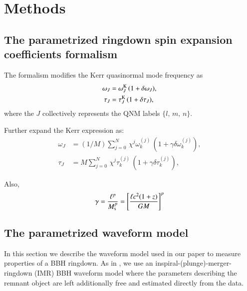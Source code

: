 \documentclass[twocolumn,prd,aps,superscriptaddress,preprintnumbers,tightenlines,showpacs,nofootinbib,amsfonts,amsmath,longbibliography]{revtex4-1}
\newcommand{\hs}[1]{{\textcolor{blue}{{[HS: #1]}} }}
\begin{document}
\section{Methods}
\label{sec:method}

\subsection{The parametrized ringdown spin expansion coefficients formalism}
\label{sec:review_parspec}


The formalism modifies the Kerr quasinormal mode frequency as
%
\begin{subequations}
\begin{align}
\omega_{J} &= \omega^{\rm K}_{J} \, (1 + \delta \omega_{J}), \\
\tau_{J}   &= \tau^{\rm K}_{J}   \, (1 + \delta \tau_{J}),
\end{align}
\label{eq:general_deviation}
\end{subequations}
%
where the $J$ collectively represents the QNM labels $\{l,\, m,\, n\}$.

Further expand the Kerr expression as:
%
\begin{subequations}
\begin{align}
\omega_{J} &= (1/M) \sum_{j = 0}^{N} \, \chi^{j} \omega^{(j)}_{k} \, \left( 1 + \gamma \delta \omega^{(j)}_{k} \right), \\
\tau_{J}   &= M     \sum_{j = 0}^{N} \, \chi^{j} \tau^{(j)}_{k}   \, \left( 1 + \gamma \delta \tau^{(j)}_{k} \right),
\end{align}
\label{eq:kerr_expansion}
\end{subequations}

Also,
%
\begin{equation}
\gamma
%
= \frac{\ell^{p}}{M_{\rm s}^{p}}
%
= \left[
\frac{\ell c^2 (1 + z)}{G M}
\right]^{p}
\label{eq:def_gamma}
\end{equation}

\subsection{The parametrized waveform model}
\label{sec:review_pSEOB}

In this section we describe the waveform model used in our paper to measure properties of a BBH ringdown. As in \cite{Brito:2018rfr,Ghosh:2021mrv}, we use an inspiral-(plunge)-merger-ringdown (IMR) BBH waveform model where the parameters describing the remnant object are left additionally free and estimated directly from the data.
\end{document}

